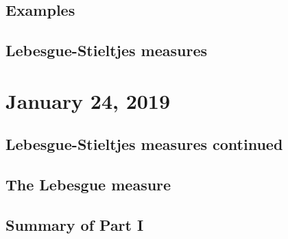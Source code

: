 \documentclass{article}
\theoremstyle{definition}
\begin{document}
\subsection{Examples}

\subsection{Lebesgue-Stieltjes measures}

\section{January 24, 2019}

\subsection{Lebesgue-Stieltjes measures continued}

\subsection{The Lebesgue measure}


\subsection{Summary of Part I}
\end{document}
